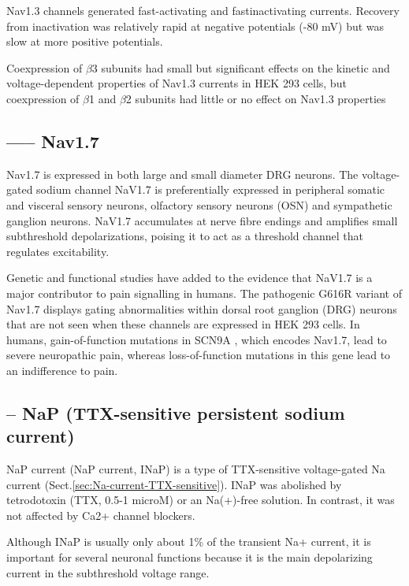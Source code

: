 Nav1.3 channels generated fast-activating and fastinactivating
currents.  Recovery from inactivation was relatively
rapid at negative potentials (-80 mV) but was slow at more
positive potentials.

Coexpression of $\beta$3 subunits had small but significant
effects on the kinetic and voltage-dependent properties of
Nav1.3 currents in HEK 293 cells, but coexpression of $\beta$1 and
$\beta$2 subunits had little or no effect on Nav1.3 properties

\subsection{----- Nav1.7}
\label{sec:Nav1.7}

Nav1.7 is expressed in both large and small diameter DRG neurons.
The voltage-gated sodium channel NaV1.7 is preferentially expressed in
peripheral somatic and visceral sensory neurons, olfactory sensory neurons (OSN)
and sympathetic ganglion neurons. NaV1.7 accumulates at nerve fibre endings and
amplifies small subthreshold depolarizations, poising it to act as a threshold
channel that regulates excitability.

Genetic and functional studies have added to the evidence that NaV1.7 is a major
contributor to pain signalling in humans.
The pathogenic G616R variant of Nav1.7 displays gating abnormalities within
dorsal root ganglion (DRG) neurons that are not seen when these channels are
expressed in HEK 293 cells. In humans, gain-of-function mutations in SCN9A ,
which encodes Nav1.7, lead to severe neuropathic pain, whereas loss-of-function
mutations in this gene lead to an indifference to pain.

\subsection{-- NaP (TTX-sensitive persistent sodium current)}
\label{sec:NaP-current}

NaP current  (NaP current, INaP) is a type of TTX-sensitive voltage-gated Na
current (Sect.\ref{sec:Na-current-TTX-sensitive}). INaP was abolished by
tetrodotoxin (TTX, 0.5-1 microM) or an Na(+)-free solution. In contrast, it was
not affected by Ca2+ channel blockers. 

Although INaP is usually only about 1\% of the transient Na+ current, it is
important for several neuronal functions because it is the main depolarizing
current in the subthreshold voltage range.

